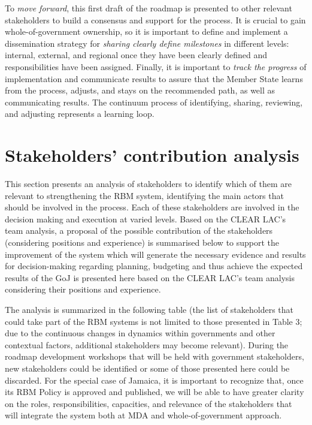 \documentclass[
  10pt,
]{book}
\begin{document}
To \emph{move forward}, this first draft of the roadmap is presented to other relevant stakeholders to build a consensus and support for the process. It is crucial to gain whole-of-government ownership, so it is important to define and implement a dissemination strategy for \emph{sharing clearly define milestones} in different levels: internal, external, and regional once they have been clearly defined and responsibilities have been assigned. Finally, it is important to \emph{track the progress} of implementation and communicate results to assure that the Member State learns from the process, adjusts, and stays on the recommended path, as well as communicating results. The continuum process of identifying, sharing, reviewing, and adjusting represents a learning loop.

\hypertarget{stakeholders-contribution-analysis}{%
\section{Stakeholders' contribution analysis}\label{stakeholders-contribution-analysis}}

This section presents an analysis of stakeholders to identify which of them are relevant to strengthening the RBM system, identifying the main actors that should be involved in the process. Each of these stakeholders are involved in the decision making and execution at varied levels. Based on the CLEAR LAC's team analysis, a proposal of the possible contribution of the stakeholders (considering positions and experience) is summarised below to support the improvement of the system which will generate the necessary evidence and results for decision-making regarding planning, budgeting and thus achieve the expected results of the GoJ is presented here based on the CLEAR LAC's team analysis considering their positions and experience.

The analysis is summarized in the following table (the list of stakeholders that could take part of the RBM systems is not limited to those presented in Table 3; due to the continuous changes in dynamics within governments and other contextual factors, additional stakeholders may become relevant). During the roadmap development workshops that will be held with government stakeholders, new stakeholders could be identified or some of those presented here could be discarded. For the special case of Jamaica, it is important to recognize that, once its RBM Policy is approved and published, we will be able to have greater clarity on the roles, responsibilities, capacities, and relevance of the stakeholders that will integrate the system both at MDA and whole-of-government approach.
\end{document}
